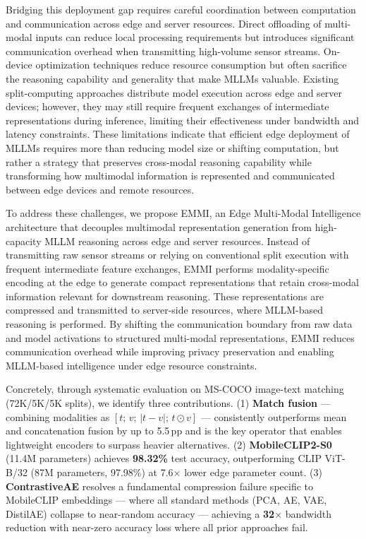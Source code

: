 \documentclass[10pt,twocolumn]{article}
\begin{document}
Bridging this deployment gap requires careful coordination
between computation and communication across edge and
server resources. Direct offloading of multi-modal inputs can
reduce local processing requirements but introduces significant communication overhead when transmitting high-volume
sensor streams. On-device optimization techniques reduce resource consumption but often sacrifice the reasoning capability
and generality that make MLLMs valuable. Existing split-computing approaches distribute model execution across edge
and server devices; however, they may still require frequent
exchanges of intermediate representations during inference,
limiting their effectiveness under bandwidth and latency constraints. These limitations indicate that efficient edge deployment of MLLMs requires more than reducing model size or
shifting computation, but rather a strategy that preserves cross-modal reasoning capability while transforming how multimodal information is represented and communicated between
edge devices and remote resources.

To address these challenges, we propose EMMI, an Edge
Multi-Modal Intelligence architecture that decouples multimodal representation generation from high-capacity MLLM
reasoning across edge and server resources. Instead of transmitting raw sensor streams or relying on conventional split execution with frequent intermediate feature exchanges, EMMI
performs modality-specific encoding at the edge to generate
compact representations that retain cross-modal information
relevant for downstream reasoning. These representations are
compressed and transmitted to server-side resources, where
MLLM-based reasoning is performed. By shifting the communication boundary from raw data and model activations to
structured multi-modal representations, EMMI reduces communication overhead while improving privacy preservation
and enabling MLLM-based intelligence under edge resource
constraints.

Concretely, through systematic evaluation on MS-COCO
image-text matching (72K/5K/5K splits), we identify three
contributions.
(1) \textbf{Match fusion} --- combining modalities as
$[t;\,v;\,|t{-}v|;\,t{\odot}v]$ --- consistently outperforms mean and
concatenation fusion by up to 5.5\,pp and is the key operator
that enables lightweight encoders to surpass heavier alternatives.
(2) \textbf{MobileCLIP2-S0} (11.4M parameters) achieves
\textbf{98.32\%} test accuracy, outperforming CLIP ViT-B/32
(87M parameters, 97.98\%) at 7.6$\times$ lower edge parameter count.
(3) \textbf{ContrastiveAE} resolves a fundamental compression
failure specific to MobileCLIP embeddings --- where all standard
methods (PCA, AE, VAE, DistilAE) collapse to near-random
accuracy --- achieving a \textbf{32$\times$} bandwidth reduction with
near-zero accuracy loss where all prior approaches fail.
\end{document}
